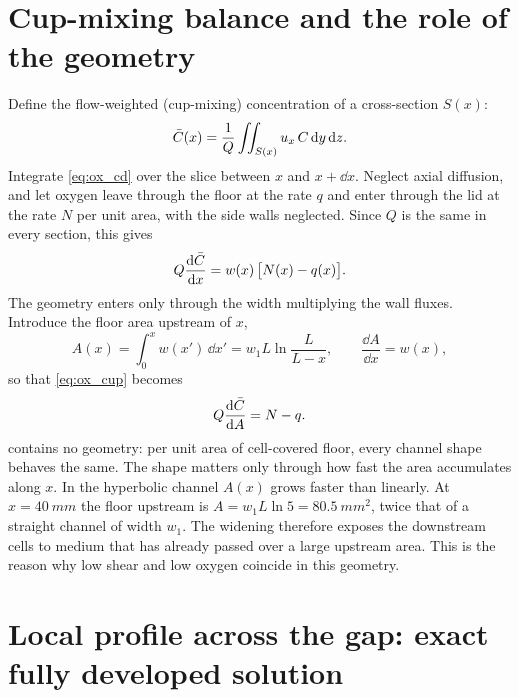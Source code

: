 \section{Cup-mixing balance and the role of the geometry}
\label{sec:ox_cup}

Define the flow-weighted (cup-mixing) concentration of a cross-section $S(x)$:
\begin{equation}
\bar C(x)=\frac{1}{Q}\iint_{S(x)}u_x\,C\,\mathrm{d} y\,\mathrm{d} z .
\end{equation}
Integrate \cref{eq:ox_cd} over the slice between $x$ and $x+\dd x$. Neglect axial diffusion, and let oxygen leave through the floor at the rate $q$ and enter through the lid at the rate $N$ per unit area, with the side walls neglected. Since $Q$ is the same in every section, this gives
\begin{equation}
Q\frac{\mathrm{d}\bar C}{\mathrm{d} x}=w(x)\,\big[N(x)-q(x)\big].
\label{eq:ox_cup}
\end{equation}
The geometry enters only through the width multiplying the wall fluxes. Introduce the floor area upstream of $x$,
\begin{equation}
A(x)=\int_0^xw(x')\,\dd x'=w_1L\ln\frac{L}{L-x},
\qquad\frac{\dd A}{\dd x}=w(x),
\label{eq:ox_area}
\end{equation}
so that \cref{eq:ox_cup} becomes
\begin{equation}
Q\frac{\mathrm{d}\bar C}{\mathrm{d} A}=N-q .
\label{eq:ox_cupA}
\end{equation}
 contains no geometry: per unit area of cell-covered floor, every channel shape behaves the same. The shape matters only through how fast the area accumulates along $x$. In the hyperbolic channel $A(x)$ grows faster than linearly. At $x=\SI{40}{mm}$ the floor upstream is $A=w_1L\ln5=\SI{80.5}{mm^2}$, twice that of a straight channel of width $w_1$. The widening therefore exposes the downstream cells to medium that has already passed over a large upstream area. This is the reason why low shear and low oxygen coincide in this geometry.

\section{Local profile across the gap: exact fully developed solution}
\label{sec:ox_local}

